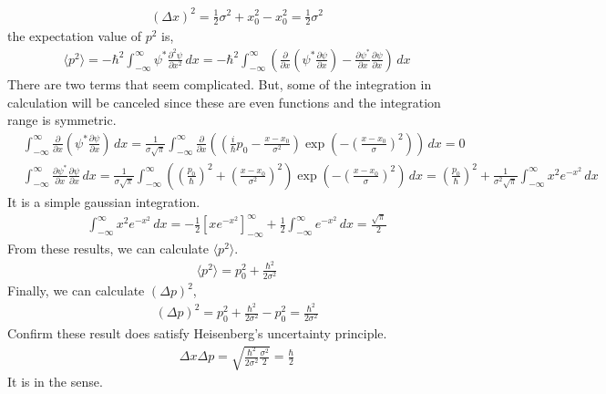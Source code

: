 \documentclass[aps,floatfix,nofootinbib,superscriptaddress,fleqn]{revtex4}
\begin{document}
\begin{itemize}
    \begin{align}
      \left(\Delta x\right)^2 = \frac{1}{2}\sigma^2+x_0^2 - x_0^2 = \frac{1}{2}\sigma^2
    \end{align}
the expectation value of $p^2$ is,
\begin{align}
  \langle p^2 \rangle = -\hbar^2 \int_{-\infty}^{\infty} \psi^* \frac{\partial^2 \psi}{\partial x^2}\,dx 
  = -\hbar^2\int_{-\infty}^{\infty} \left(\frac{\partial}{\partial x} \left(\psi^* \frac{\partial \psi}{\partial x}\right) - \frac{\partial \psi^*}{\partial x}\frac{\partial \psi}{\partial x}\right)\,dx
\end{align}
There are two terms that seem complicated. But, some of the integration in calculation will be canceled since these are even functions and the integration range is symmetric.
\begin{align}   
       &\int_{-\infty}^{\infty} \frac{\partial}{\partial x}
          \left(\psi^* \frac{\partial \psi}{\partial x}
          \right) \,dx 
          = \frac{1}{\sigma\sqrt{\pi}}\int_{-\infty}^{\infty}\frac{\partial}{\partial x}
            \left(
              \left(\frac{i}{\hbar}p_0-\frac{x-x_0}{\sigma^2}
              \right)\exp
                \left(-{
                  \left(\frac{x-x_0}{\sigma}
                  \right)}^2 
                \right)
              \right)\,dx = 0
   \\  &\int_{-\infty}^{\infty} \frac{\partial \psi^*}{\partial x}\frac{\partial \psi}{\partial x} \,dx 
          = \frac{1}{\sigma\sqrt{\pi}}\int_{-\infty}^{\infty}
            \left(
              \left(\frac{p_0}{\hbar}
                                     \right)^2
             +\left(\frac{x-x_0}{\sigma^2}
                                          \right)^2
                                                    \right)\exp
            \left(-{
              \left(\frac{x-x_0}{\sigma}
                                        \right)}^2
                                                  \right)\,dx 
          = \left(\frac{p_0}{\hbar}
                                    \right)^2+\frac{1}{\sigma^2\sqrt{\pi}}\int_{-\infty}^{\infty} x^2e^{-x^2}\,dx
\end{align}
It is a simple gaussian integration.
\begin{align}
  \int_{-\infty}^{\infty} x^2e^{-x^2}\,dx = -\frac{1}{2}\left[xe^{-x^2}\right]^{\infty}_{-\infty}+\frac{1}{2}\int_{-\infty}^{\infty} e^{-x^2}\,dx = \frac{\sqrt{\pi}}{2}
\end{align}
From these results, we can calculate $\langle p^2 \rangle$.
\begin{align}
  \langle p^2 \rangle = p_0^2 + \frac{\hbar^2}{2\sigma^2}
\end{align}
Finally, we can calculate $\left( \Delta p \right)^2$,
\begin{align}
  \left( \Delta p \right)^2 = p_0^2 + \frac{\hbar^2}{2\sigma^2} - p_0^2 = \frac{\hbar^2}{2\sigma^2}
\end{align}
Confirm these result does satisfy Heisenberg's uncertainty principle.
\begin{align}
  \Delta x \Delta p = \sqrt{\frac{\hbar^2}{2\sigma^2}\frac{\sigma^2}{2}} = \frac{\hbar}{2}
\end{align}
It is in the sense.
  \end{itemize}
\end{document}
